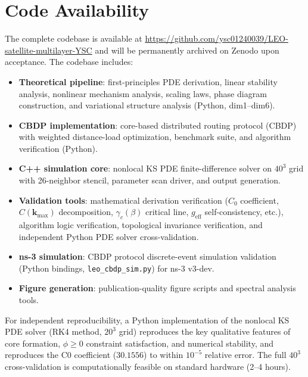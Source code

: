 \documentclass[sn-nature,pdflatex]{sn-jnl}
\begin{document}
\section*{Code Availability}
The complete codebase is available at \url{https://github.com/ysc01240039/LEO-satellite-multilayer-YSC} and will be permanently archived on Zenodo upon acceptance. The codebase includes:
\begin{itemize}
  \item \textbf{Theoretical pipeline}: first-principles PDE derivation, linear stability analysis, nonlinear mechanism analysis, scaling laws, phase diagram construction, and variational structure analysis (Python, dim1--dim6).
  \item \textbf{CBDP implementation}: core-based distributed routing protocol (CBDP) with weighted distance-load optimization, benchmark suite, and algorithm verification (Python).
  \item \textbf{C++ simulation core}: nonlocal KS PDE finite-difference solver on $40^3$ grid with 26-neighbor stencil, parameter scan driver, and output generation.
  \item \textbf{Validation tools}: mathematical derivation verification ($C_0$ coefficient, $C(\mathbf{k}_{\max})$ decomposition, $\gamma_c(\beta)$ critical line, $g_{\text{eff}}$ self-consistency, etc.), algorithm logic verification, topological invariance verification, and independent Python PDE solver cross-validation.
  \item \textbf{ns-3 simulation}: CBDP protocol discrete-event simulation validation (Python bindings, \texttt{leo\_cbdp\_sim.py}) for ns-3 v3-dev.
  \item \textbf{Figure generation}: publication-quality figure scripts and spectral analysis tools.
\end{itemize}
For independent reproducibility, a Python implementation of the nonlocal KS PDE solver (RK4 method, $20^3$ grid) reproduces the key qualitative features of core formation, $\phi \ge 0$ constraint satisfaction, and numerical stability, and reproduces the C0 coefficient ($30.1556$) to within $10^{-5}$ relative error. The full $40^3$ cross-validation is computationally feasible on standard hardware (2--4 hours).


\end{document}
